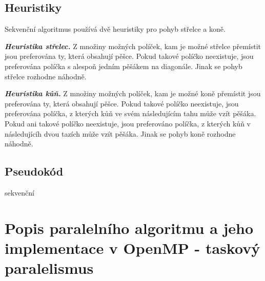 \documentclass{article}
\newcommand{\heuristika}[1]{\textbf{\textit{Heuristika {#1}.}}}
\begin{document}
    \label{subsec:seq-heuristics}

    \subsection{Heuristiky}

    Sekvenční algoritmus používá dvě heuristiky pro pohyb střelce a koně.

    \heuristika{střelec} Z množiny možných políček, kam je možné střelce přemístit jsou preferována ty,
    která obsahují pěšce. Pokud takové políčko neexistuje, jsou preferována políčka s alespoň jedním pěšákem
    na diagonále. Jinak se pohyb střelce rozhodne náhodně.
    \hspace{1.5pt}

    \heuristika{kůň} Z množiny možných políček, kam je možné koně přemístit jsou preferována ty,
    která obsahují pěšce. Pokud takové políčko neexistuje, jsou preferována políčka, z kterých
    kůň ve svém následujícím tahu může vzít pěšáka. Pokud ani takové políčko neexistuje, jsou
    preferováno políčka, z kterých kůň v následujícíh dvou tazích může vzít pěšáka.
    Jinak se pohyb koně rozhodne náhodně.

    \subsection{Pseudokód}
    \begin{algorithm}[H]
        \SetAlgoLined

        \BlankLine

        \;
        \caption{sekvenční}
        \label{alg:sequential}
    \end{algorithm}

    \label{sec:task-par}


    \section{Popis paralelního algoritmu a jeho implementace v OpenMP - taskový paralelismus}
\end{document}
